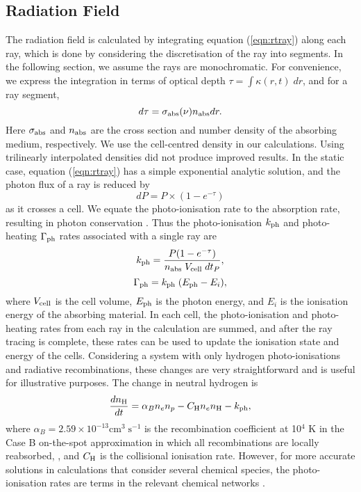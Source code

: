 \documentclass[useAMS,usenatbib]{mn2e}
\begin{document}
\subsection{Radiation Field}

The radiation field is calculated by integrating equation
(\ref{eqn:rtray}) along each ray, which is done by considering the
discretisation of the ray into segments.  In the following section, we
assume the rays are monochromatic.  For convenience, we express the
integration in terms of optical depth $\tau = \int \kappa(r,t) \; dr$,
and for a ray segment,
%
\begin{equation}
  \label{eqn:dtau}
  d\tau = \sigma_{\rm abs}(\nu) n_{\rm abs} dr.
\end{equation}
Here $\sigma_{\rm abs}$ and $n_{\rm abs}$ are the cross section and
number density of the absorbing medium, respectively.  We use the
cell-centred density in our calculations.  Using trilinearly
interpolated densities \citep[see][]{Mellema06} did not produce
improved results.  In the static case, equation (\ref{eqn:rtray}) has
a simple exponential analytic solution, and the photon flux of a ray
is reduced by
%
\begin{equation}
  \label{eqn:flux}
  dP = P \times (1 - e^{-\tau})
\end{equation}
as it crosses a cell.  We equate the photo-ionisation rate to the
absorption rate, resulting in photon conservation \citep{Abel99_RT,
  Mellema06}.  Thus the photo-ionisation $k_{\rm ph}$ and
photo-heating $\Gamma_{\rm ph}$ rates associated with a single ray are
%
\begin{equation}
  \label{eqn:kph}
  k_{\rm ph} = \frac{P (1 - e^{-\tau})}{n_{\rm abs} \; V_{\rm cell} \; dt_P},
\end{equation}
\begin{equation}
  \label{eqn:gamma}
  \Gamma_{\rm ph} = k_{\rm ph} \; (E_{\rm ph} - E_i),
\end{equation}
where $V_{\rm cell}$ is the cell volume, $E_{\rm ph}$ is the photon
energy, and $E_i$ is the ionisation energy of the absorbing material.
In each cell, the photo-ionisation and photo-heating rates from each
ray in the calculation are summed, and after the ray tracing is
complete, these rates can be used to update the ionisation state and
energy of the cells.  Considering a system with only hydrogen
photo-ionisations and radiative recombinations, these changes are very
straightforward and is useful for illustrative purposes.  The change
in neutral hydrogen is
%
\begin{equation}
\label{eqn:dndt}
\frac{dn_{\rm H}}{dt} = \alpha_B n_e n_p - C_{\rm H} n_e n_{\rm
  H} - k_{\rm ph},
\end{equation}
where $\alpha_B = 2.59 \times 10^{-13} \mathrm{cm}^3 \;
\mathrm{s}^{-1}$ is the recombination coefficient at 10$^4$ K in the
Case B on-the-spot approximation in which all recombinations are
locally reabsorbed, \citep{Spitzer78}, and $C_{\rm H}$ is the
collisional ionisation rate.  However, for more accurate solutions in
calculations that consider several chemical species, the
photo-ionisation rates are terms in the relevant chemical networks
\citep[e.g.][]{Abel97}.
\end{document}

